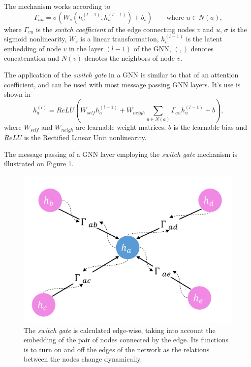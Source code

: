 \documentclass[12pt,a4paper]{article}
\begin{document}
	The mechanism works according to 
	\begin{equation}
		\Gamma_{au}=\sigma\left(W_s(h^{(l-1)}_a, h^{(l-1)}_u) + b_s\right) \qquad \text{where } u \in N(a)\text{,} \label{switch}
	\end{equation}
	where $\Gamma_{vu}$ is the \emph{switch coefficient} of the edge connecting nodes $v$ and $u$, $\sigma$ is the sigmoid nonlinearity, $W_s$ is a linear transformation, $h^{(l-1)}_v$ is the latent embedding of node $v$ in the layer $(l-1)$ of the GNN, $( ,)$ denotes concatenation and $N(v)$ denotes the neighbors of node $v$.

	The application of the \emph{switch gate} in a GNN is similar to that of an attention coefficient, and can be used with most message passing GNN layers. It’s use is shown in 
	\begin{equation}
	h^{(l)}_a = ReLU\left(W_{self}h^{(l-1)}_a+W_{neigh}\sum_{u \in N(a)}\Gamma_{au}h^{(l-1)}_u + b\right) \text{,} \label{gnn}
	\end{equation}
	where $W_{self}$ and $W_{neigh}$ are learnable weight matrices, $b$ is the learnable bias and $ReLU$ is the Rectified Linear Unit nonlinearity.
	
	The message passing of a GNN layer employing the \emph{switch gate} mechanism is illustrated on Figure \ref{gate}.
	
	\begin{figure}[hbtp]
	\centering \includegraphics[scale=0.6]{gnn_w_gate.png}
	\caption{The \emph{switch gate} is calculated edge-wise, taking into account the embedding of the pair of nodes connected by the edge. Its functions is to turn on and off the edges of the network as the relations between the nodes change dynamically. \label{gate}}
	\end{figure}
\end{document}

